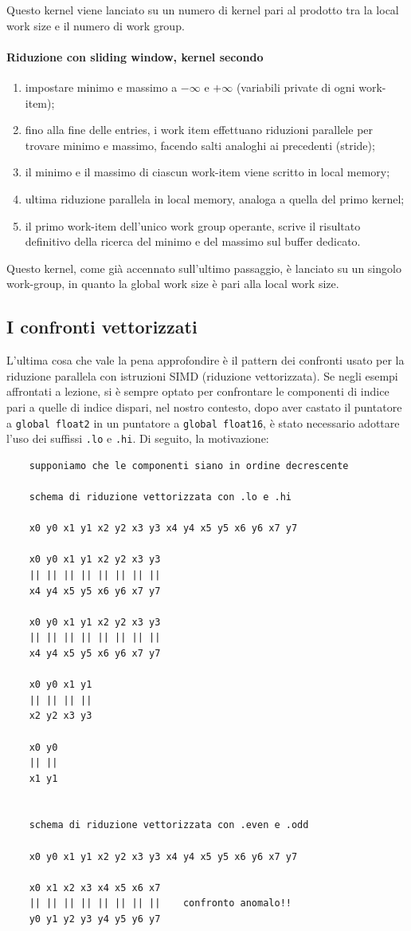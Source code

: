 \documentclass{article}
\begin{document}
	Questo kernel viene lanciato su un numero di kernel pari al prodotto tra la local work size e il numero di work group.
	
	\paragraph{Riduzione con sliding window, kernel secondo} 
	\begin{enumerate}
	\item impostare minimo e massimo a $-\infty$  e $+\infty$ (variabili private di ogni work-item);
	\item fino alla fine delle entries, i work item effettuano riduzioni parallele per trovare minimo e massimo, facendo salti analoghi ai precedenti (stride);
	\item il minimo e il massimo di ciascun work-item viene scritto in local memory;
	\item ultima riduzione parallela in local memory, analoga a quella del primo kernel;
	\item il primo work-item dell'unico work group operante, scrive il risultato definitivo della ricerca del minimo e del massimo sul buffer dedicato.
	\end{enumerate}
	Questo kernel, come già accennato sull'ultimo passaggio, è lanciato su un singolo work-group, in quanto la global work size è pari alla local work size.
	
	\subsection{I confronti vettorizzati}
	L'ultima cosa che vale la pena approfondire è il pattern dei confronti usato per la riduzione parallela con istruzioni SIMD (riduzione vettorizzata).
	Se negli esempi affrontati a lezione, si è sempre optato per confrontare le componenti di indice pari a quelle di indice dispari, nel nostro contesto, dopo aver castato il puntatore a \verb|global float2| in un puntatore a \verb|global float16|, è stato necessario adottare l'uso dei suffissi \verb|.lo| e \verb|.hi|. Di seguito, la motivazione:
	
	\begin{verbatim}
	supponiamo che le componenti siano in ordine decrescente
	         
	schema di riduzione vettorizzata con .lo e .hi
	
	x0 y0 x1 y1 x2 y2 x3 y3 x4 y4 x5 y5 x6 y6 x7 y7
	
	x0 y0 x1 y1 x2 y2 x3 y3 
	|| || || || || || || ||
	x4 y4 x5 y5 x6 y6 x7 y7
	
	x0 y0 x1 y1 x2 y2 x3 y3 
	|| || || || || || || ||
	x4 y4 x5 y5 x6 y6 x7 y7
	
	x0 y0 x1 y1
	|| || || ||
	x2 y2 x3 y3 
	
	x0 y0 
	|| ||
	x1 y1
	
	
	schema di riduzione vettorizzata con .even e .odd
	
	x0 y0 x1 y1 x2 y2 x3 y3 x4 y4 x5 y5 x6 y6 x7 y7
	
	x0 x1 x2 x3 x4 x5 x6 x7
	|| || || || || || || ||    confronto anomalo!!
	y0 y1 y2 y3 y4 y5 y6 y7
	\end{verbatim} 
	
\end{document}
